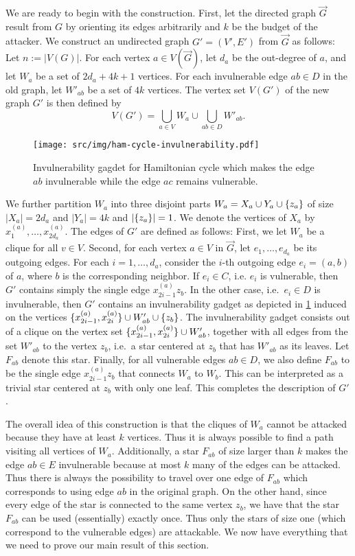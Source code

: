 We are ready to begin with the construction.
First, let the directed graph $\overrightarrow{G}$ result from $G$ by orienting its edges arbitrarily and $k$ be the budget of the attacker.
We construct an undirected graph $G' = (V', E')$ from $\overrightarrow{G}$ as follows: 
Let $n := |V(G)|$.
For each vertex $a \in V(\overrightarrow{G})$, let $d_a$ be the out-degree of $a$, and let $W_a$ be a set of $2d_a + 4k + 1$ vertices.
For each invulnerable edge $ab \in D$ in the old graph, let  $W'_{ab}$ be a set of $4k$ vertices.
The vertex set $V(G')$ of the new graph $G'$ is then defined by
\[ V(G') = \bigcup_{a \in V} W_a \cup \bigcup_{ab \in D} W'_{ab}.\]
\begin{figure}
    \centering
    \texttt{[image: src/img/ham-cycle-invulnerability.pdf]}
    \caption{Invulnerability gagdet for Hamiltonian cycle which makes the edge $ab$ invulnerable while the edge $ac$ remains vulnerable.}
    \label{fig:ham-cycle-invulnerability}
\end{figure}
We further partition $W_a$ into three disjoint parts $W_a = X_a \cup Y_a \cup \{ z_a \}$ of size $|X_a| = 2d_a$ and $|Y_a| = 4k$ and $|\{ z_a \}| = 1$.
We denote the vertices of $X_a$ by $x^{(a)}_1, \dots, x^{(a)}_{2d_a}$.
The edges of $G'$ are defined as follows:
First, we let $W_a$ be a clique for all $v \in V$.
Second, for each vertex $a \in V$ in $\overrightarrow{G}$, let $e_1, \dots, e_{d_a}$ be its outgoing edges.
For each $i = 1, \dots, d_a$, consider the $i$-th outgoing edge $e_i = (a, b)$ of $a$, where $b$ is the corresponding neighbor. 
If $e_i \in C$, i.e. $e_i$ is vulnerable, then $G'$ contains simply the single edge $x^{(a)}_{2i-1}z_b$. 
In the other case, i.e.\ $e_i \in D$ is invulnerable, then $G'$ contains an invulnerability gadget as depicted in \cref{fig:ham-cycle-invulnerability} induced on the vertices $\{ x^{(a)}_{2i-1}, x^{(a)}_{2i} \} \cup W'_{ab} \cup \{ z_b \}$.
The invulnerability gadget consists out of a clique on the vertex set $\{ x^{(a)}_{2i-1}, x^{(a)}_{2i} \} \cup W'_{ab}$, together with all edges from the set $W'_{ab}$ to the vertex $z_b$, i.e.\ a star centered at $z_b$ that has $W'_{ab}$ as its leaves.
Let $F_{ab}$ denote this star. 
Finally, for all vulnerable edges $ab \in D$, we also define $F_{ab}$ to be the single edge $x^{(a)}_{2i-1}z_b$ that connects $W_a$ to $W_b$.
This can be interpreted as a trivial star centered at $z_b$ with only one leaf.
This completes the description of $G'$.

The overall idea of this construction is that the cliques of $W_a$ cannot be attacked because they have at least $k$ vertices.
Thus it is always possible to find a path visiting all vertices of $W_a$.
Additionally, a star $F_{ab}$ of size larger than $k$ makes the edge $ab \in E$ invulnerable because at most $k$ many of the edges can be attacked.
Thus there is always the possibility to travel over one edge of $F_{ab}$ which corresponds to using edge $ab$ in the original graph.
On the other hand, since every edge of the star is connected to the same vertex $z_b$, we have that the star $F_{ab}$ can be used (essentially) exactly once.
Thus only the stars of size one (which correspond to the vulnerable edges) are attackable.
We now have everything that we need to prove our main result of this section. 


